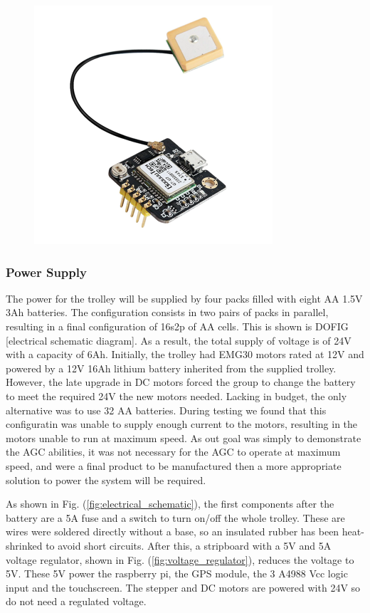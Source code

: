 \documentclass[11pt,landscape]{article}
\begin{document}
\begin{multicols}{3}
\begin{figure}[H]
    \begin{center}
        \includegraphics[]{gps_module.png}
        \label{fig:gps_module}
    \end{center}
\end{figure}


\subsubsection{Power Supply}
The power for the trolley will be supplied by four packs filled with eight AA
1.5V 3Ah batteries. The configuration consists in two pairs of packs in
parallel, resulting in a final configuration of 16s2p of AA cells. This is shown
is DOFIG [electrical schematic diagram]. As a result, the total supply of
voltage is of 24V with a capacity of 6Ah. Initially, the trolley had EMG30
motors rated at 12V and powered by a 12V 16Ah lithium battery inherited from the
supplied trolley. However, the late upgrade in DC motors forced the group to
change the battery to meet the required 24V the new motors needed. Lacking in
budget, the only alternative was to use 32 AA batteries. During testing we found
that this configuratin was unable to supply enough current to the motors,
resulting in the motors unable to run at maximum speed. As out goal was simply
to demonstrate the AGC abilities, it was not necessary for the AGC to operate at
maximum speed, and were a final product to be manufactured then a more
appropriate solution to power the system will be required.

As shown in Fig. (\ref{fig:electrical_schematic}), the first components after
the battery are a 5A fuse and a switch to turn on/off the whole trolley. These
are wires were soldered directly without a base, so an insulated rubber has been
heat-shrinked to avoid short circuits. After this, a stripboard with a 5V and 5A
voltage regulator, shown in Fig. (\ref{fig:voltage_regulator}),
reduces the voltage to 5V. These 5V power the raspberry pi, the GPS module, the
3 A4988 Vcc logic input and the touchscreen. The stepper and DC motors are
powered with 24V so do not need a regulated voltage. 


\end{multicols}
\end{document}
